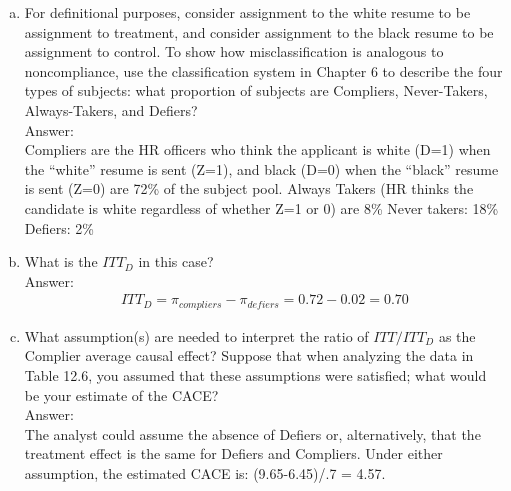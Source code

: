 \documentclass[11pt,notitlepage]{article}\usepackage[]{graphicx}\usepackage[]{color}
\begin{document}
\begin{enumerate}[a)]
\item For definitional purposes, consider assignment to the white resume to be assignment to treatment, and consider assignment to the black resume to be assignment to control. To show how misclassification is analogous to noncompliance, use the classification system in Chapter 6 to describe the four types of subjects: what proportion of subjects are Compliers, Never-Takers, Always-Takers, and Defiers?\\
Answer:\\
Compliers are the HR officers who think the applicant is white (D=1) when the ``white'' resume is sent (Z=1), and black (D=0) when the ``black'' resume is sent  (Z=0) are 72\% of the subject pool. 
Always Takers (HR thinks the candidate is white regardless of whether Z=1 or 0) are 8\%
Never takers: 18\%
Defiers: 2\%

\item What is the $ITT_D$ in this case?\\
Answer:\\
\begin{align*}
ITT_D = \pi_{compliers} - \pi_{defiers} = 0.72 - 0.02 = 0.70
\end{align*}

\item What assumption(s) are needed to interpret the ratio of $ITT/ITT_D$ as the Complier average causal effect? Suppose that when analyzing the data in Table 12.6, you assumed that these assumptions were satisfied; what would be your estimate of the CACE?\\
Answer:\\
The analyst could assume the absence of Defiers or, alternatively, that the treatment effect is the same for Defiers and Compliers.  Under either assumption, the estimated CACE is: (9.65-6.45)/.7 = 4.57.


\end{enumerate}
\end{document}
